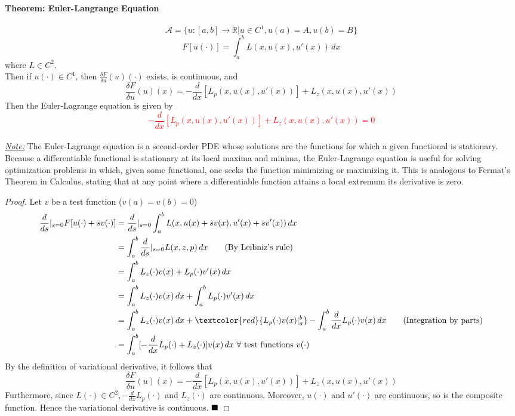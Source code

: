 \documentclass[11pt]{article}
\newcommand{\ti}[1]{\textit{#1}}
\newcommand{\mc}[1]{\mathcal{#1}}
\newcommand{\real}[0]{\mathbb{R}}
\newcommand{\under}[1]{\underline{#1}}
\newcommand{\qed}[0]{$\hfill\blacksquare$}
\begin{document}
\paragraph{Theorem: Euler-Langrange Equation}
$$\mc{A} = \{ u: [a,b] \rightarrow \real | u \in C^1, u(a) = A, u(b) = B\}$$
$$F[u(\cdot)] = \int_a^b L(x,u(x),u'(x))\, dx$$
where $L \in C^2$. \\
Then if $u(\cdot) \in C^1$, then
$\frac{\delta F}{\delta u}(u)(\cdot)$ exists, is continuous, and
$$\frac{\delta F}{\delta u}(u)(x) = -\frac{d}{dx}[L_p(x,u(x),u'(x))] + L_z(x,u(x),u'(x))$$
Then the Euler-Lagrange equation is given by
\textcolor{red}{$$-\frac{d}{dx}[L_p(x,u(x),u'(x))] + L_z(x,u(x),u'(x)) = 0$$}\\
\ti{\under{Note:}} The Euler-Lagrange equation is a second-order PDE whose solutions are the functions for which a given functional is stationary. Because a differentiable functional is stationary at its local maxima and minima, the Euler-Lagrange equation is useful for solving optimization problems in which, given some functional, one seeks the function minimizing or maximizing it. This is analogous to Fermat's Theorem in Calculus, stating that at any point where a differentiable function attains a local extremum its derivative is zero. \\
\begin{proof}
	Let $v$ be a test function ($v(a) = v(b) = 0$)
	\begin{align}
		\frac{d}{ds} |_{s=0} F[u(\cdot) + sv(\cdot)] 
		&= \frac{d}{ds}|_{s=0}\int_a^b L(x, u(x) + sv(x), u'(x) + sv'(x)) \, dx \\
		&= \int_a^b \frac{d}{ds}|_{s=0} L(x,z,p)\, dx \tag{By Leibniz's rule}\\
		&= \int_a^b L_z(\cdot)v(x) + L_p(\cdot)v'(x)\, dx \\
		&= \int_a^b L_z(\cdot)v(x) \, dx + \int_a^b L_p(\cdot)v'(x)\, dx \\
		&= \int_a^b L_z(\cdot)v(x) \, dx + \textcolor{red}{L_p(\cdot)v(x)|_a^b} - \int_a^b \frac{d}{dx}L_p(\cdot)v(x) \, dx \tag{Integration by parts} \\
		&= \int_a^b [-\frac{d}{dx}L_p(\cdot) + L_z(\cdot)]v(x) \, dx \text{  $\forall$ test functions $v(\cdot)$} 
	\end{align}
	By the definition of variational derivative, it follows that 
	$$\frac{\delta F}{\delta u}(u)(x) = -\frac{d}{dx}[L_p(x,u(x),u'(x))] + L_z(x,u(x),u'(x))$$
	Furthermore, since $L(\cdot) \in C^2, -\frac{d}{dx}L_p(\cdot)$ and $L_z(\cdot)$ are  continuous. Moreover, $u(\cdot)$ and $u'(\cdot)$ are continuous, so is the composite function. Hence the variational derivative is continuous. \qed
\end{proof}
\end{document}

